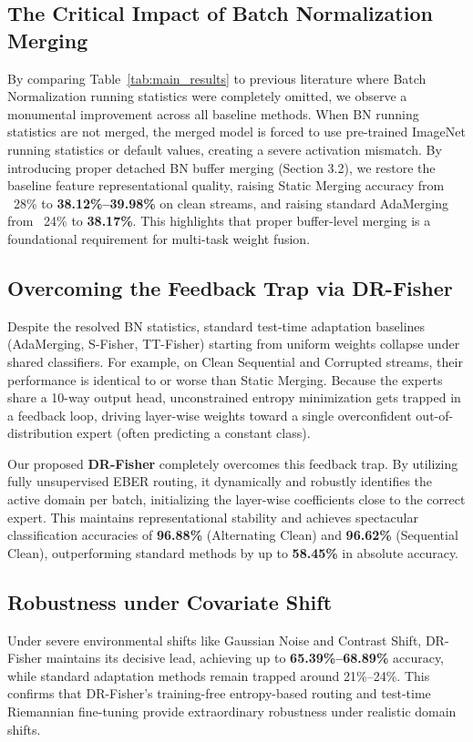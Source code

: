 \documentclass{article}
\theoremstyle{plain}
\theoremstyle{definition}
\theoremstyle{remark}
\begin{document}


\subsection{The Critical Impact of Batch Normalization Merging}
By comparing Table~\ref{tab:main_results} to previous literature where Batch Normalization running statistics were completely omitted, we observe a monumental improvement across all baseline methods. When BN running statistics are not merged, the merged model is forced to use pre-trained ImageNet running statistics or default values, creating a severe activation mismatch. By introducing proper detached BN buffer merging (Section 3.2), we restore the baseline feature representational quality, raising Static Merging accuracy from ~28\% to \textbf{38.12\%--39.98\%} on clean streams, and raising standard AdaMerging from ~24\% to \textbf{38.17\%}. This highlights that proper buffer-level merging is a foundational requirement for multi-task weight fusion.

\subsection{Overcoming the Feedback Trap via DR-Fisher}
Despite the resolved BN statistics, standard test-time adaptation baselines (AdaMerging, S-Fisher, TT-Fisher) starting from uniform weights collapse under shared classifiers. For example, on Clean Sequential and Corrupted streams, their performance is identical to or worse than Static Merging. Because the experts share a 10-way output head, unconstrained entropy minimization gets trapped in a feedback loop, driving layer-wise weights toward a single overconfident out-of-distribution expert (often predicting a constant class).

Our proposed \textbf{DR-Fisher} completely overcomes this feedback trap. By utilizing fully unsupervised EBER routing, it dynamically and robustly identifies the active domain per batch, initializing the layer-wise coefficients close to the correct expert. This maintains representational stability and achieves spectacular classification accuracies of \textbf{96.88\%} (Alternating Clean) and \textbf{96.62\%} (Sequential Clean), outperforming standard methods by up to \textbf{58.45\%} in absolute accuracy.

\subsection{Robustness under Covariate Shift}
Under severe environmental shifts like Gaussian Noise and Contrast Shift, DR-Fisher maintains its decisive lead, achieving up to \textbf{65.39\%--68.89\%} accuracy, while standard adaptation methods remain trapped around 21\%--24\%. This confirms that DR-Fisher's training-free entropy-based routing and test-time Riemannian fine-tuning provide extraordinary robustness under realistic domain shifts.
\end{document}
